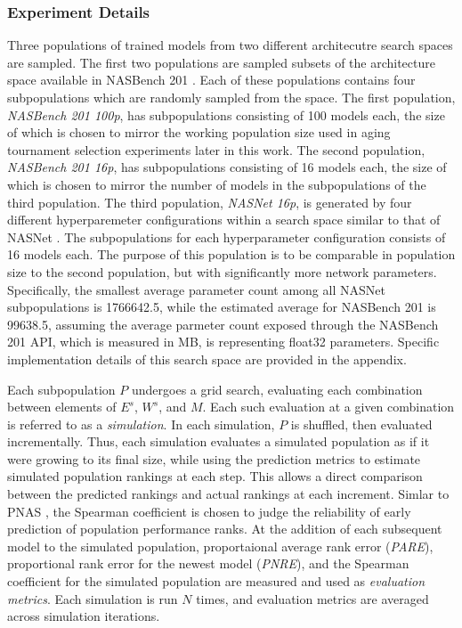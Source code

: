 \documentclass[twocolumn]{article}
\begin{document}
\subsubsection{Experiment Details}
Three populations of trained models from two different architecutre search spaces are sampled.
The first two populations are sampled subsets of the architecture space available in NASBench 201 \cite{nasbench201}.
Each of these populations contains four subpopulations which are randomly sampled from the space.
The first population, \emph{NASBench 201 100p}, has subpopulations consisting of 100 models each, the size of which is chosen to mirror the working population size 
used in aging tournament selection experiments later in this work.
The second population, \emph{NASBench 201 16p}, has subpopulations consisting of 16 models each, the size of which is chosen to mirror the number of models in the 
subpopulations of the third population.
The third population, \emph{NASNet 16p}, is generated by four different hyperparemeter configurations within a search space similar to that of NASNet \cite{nasnet}.
The subpopulations for each hyperparameter configuration consists of 16 models each.
The purpose of this population is to be comparable in population size to the second population, but with significantly more network parameters.
Specifically, the smallest average parameter count among all NASNet subpopulations is 1766642.5, while the estimated average for NASBench 201 is 99638.5, assuming
the average parmeter count exposed through the NASBench 201 API, which is measured in MB, is representing float32 parameters.
Specific implementation details of this search space are provided in the appendix.

Each subpopulation $P$ undergoes a grid search, evaluating each combination between elements of $E^s$, $W^s$, and $M$.
Each such evaluation at a given combination is referred to as a \emph{simulation}.
In each simulation, $P$ is shuffled, then evaluated incrementally.
Thus, each simulation evaluates a simulated population as if it were growing to its final size, while using
the prediction metrics to estimate simulated population rankings at each step.
This allows a direct comparison between the predicted rankings and actual rankings at each increment.
Simlar to PNAS \cite{pnas}, the Spearman coefficient is chosen to judge the reliability of early prediction of population performance ranks.
At the addition of each subsequent model to the simulated population, proportaional average rank error (\emph{PARE}), proportional rank error for the newest model (\emph{PNRE}), and the Spearman coefficient
for the simulated population are measured and used as \emph{evaluation metrics}.
Each simulation is run $N$ times, and evaluation metrics are averaged across simulation iterations. 
\end{document}

